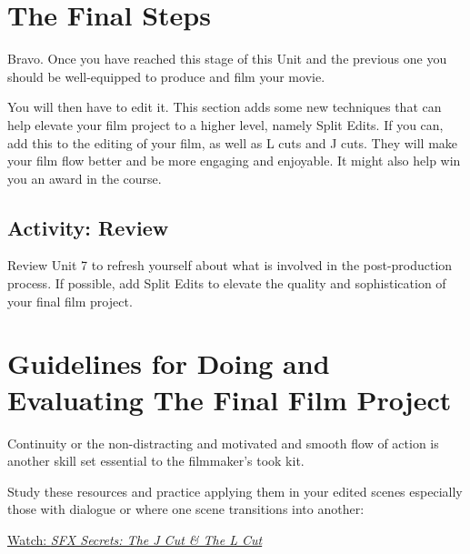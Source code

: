 \documentclass[
  letterpaper,
  DIV=11,
  numbers=noendperiod]{scrreprt}
\begin{document}
\section{The Final Steps}\label{the-final-steps}

Bravo. Once you have reached this stage of this Unit and the previous
one you should be well-equipped to produce and film your movie.

You will then have to edit it. This section adds some new techniques
that can help elevate your film project to a higher level, namely Split
Edits. If you can, add this to the editing of your film, as well as L
cuts and J cuts. They will make your film flow better and be more
engaging and enjoyable. It might also help win you an award in the
course.

\subsection{Activity: Review}\label{activity-review}

\begin{tcolorbox}[enhanced jigsaw, titlerule=0mm, leftrule=.75mm, bottomrule=.15mm, colback=white, left=2mm, opacitybacktitle=0.6, title={Learning Activity}, colbacktitle=quarto-callout-note-color!10!white, colframe=quarto-callout-note-color-frame, bottomtitle=1mm, toptitle=1mm, opacityback=0, rightrule=.15mm, breakable, arc=.35mm, toprule=.15mm, coltitle=black]

Review Unit 7 to refresh yourself about what is involved in the
post-production process. If possible, add Split Edits to elevate the
quality and sophistication of your final film project.

\end{tcolorbox}

\section{Guidelines for Doing and Evaluating The Final Film
Project}\label{guidelines-for-doing-and-evaluating-the-final-film-project}

Continuity or the non-distracting and motivated and smooth flow of
action is another skill set essential to the filmmaker's took kit.

Study these resources and practice applying them in your edited scenes
especially those with dialogue or where one scene transitions into
another:

\href{https://www.youtube.com/watch?v=eyH-a964kAs}{Watch: \emph{SFX
Secrets: The J Cut \& The L Cut}}
\end{document}
